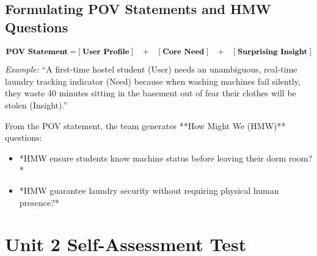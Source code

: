 \subsection{Formulating POV Statements and HMW Questions}
\begin{keyequation}
\begin{equation}
\text{\textbf{POV Statement}} = [\;\text{\textbf{User Profile}}\;] \quad+\quad [\;\text{\textbf{Core Need}}\;] \quad+\quad [\;\text{\textbf{Surprising Insight}}\;]
\end{equation}
\textit{Example:} ``A first-time hostel student (User) needs an unambiguous, real-time laundry tracking indicator (Need) because when washing machines fail silently, they waste 40 minutes sitting in the basement out of fear their clothes will be stolen (Insight).''
\end{keyequation}

\noindent From the POV statement, the team generates **How Might We (HMW)** questions:
\begin{itemize}[leftmargin=1.2em, itemsep=2pt]
    \item *HMW ensure students know machine status before leaving their dorm room?*
    \item *HMW guarantee laundry security without requiring physical human presence?*
\end{itemize}

\section{Unit 2 Self-Assessment Test}

